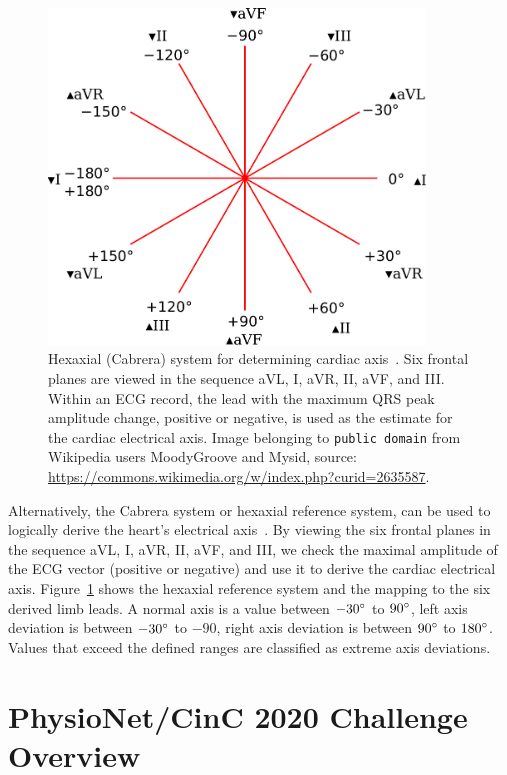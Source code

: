 \documentclass[\main/thesis.tex]{subfiles}
\begin{document}
\begin{figure}
    \centering
    \includegraphics[width=10cm]{figure/Hexaxial_reference_system.pdf}
    \caption[Hexaxial (Cabrera) system for determining cardiac axis. Six frontal planes are viewed in the sequence aVL, I, aVR, II, aVF, and III.]{Hexaxial (Cabrera) system for determining cardiac axis~\cite{valentinuni1970properties}. Six frontal planes are viewed in the sequence aVL, I, aVR, II, aVF, and III. Within an ECG record, the lead with the maximum QRS peak amplitude change, positive or negative, is used as the estimate for the cardiac electrical axis.
    Image belonging to \texttt{public domain} from Wikipedia users MoodyGroove and Mysid, source: \url{https://commons.wikimedia.org/w/index.php?curid=2635587}.
    }
    \label{fig:hexaxial_reference}
\end{figure}

Alternatively, the Cabrera system or hexaxial reference system, can be used to logically derive the heart's electrical axis~\cite{lam_classical_2015, valentinuni1970properties}.
By viewing the six frontal planes in the sequence aVL, I, aVR, II, aVF, and III, we check the maximal amplitude of the ECG vector (positive or negative) and use it to derive the cardiac electrical axis.
Figure~\ref{fig:hexaxial_reference} shows the hexaxial reference system and the mapping to the six derived limb leads.
A normal axis is a value between $-30\degree$ to $90\degree$, left axis deviation is between $-30\degree$ to $-90$, right axis deviation is between $90\degree$ to $180\degree$.
Values that exceed the defined ranges are classified as extreme axis deviations.

\section{PhysioNet/CinC 2020 Challenge Overview}
\end{document}
